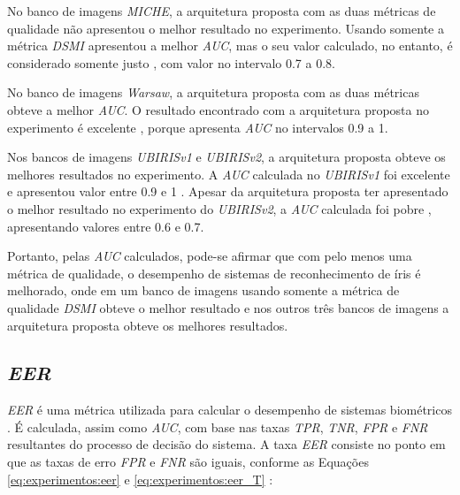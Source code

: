 \par No banco de imagens \textit{MICHE}, a arquitetura proposta com as duas métricas de qualidade não apresentou o melhor resultado no experimento. Usando somente a métrica \textit{\acrshort{DSMI}} apresentou a melhor \textit{\acrshort{AUC}}, mas o seu valor calculado, no entanto, é considerado somente justo \cite{aucROC}, com valor no intervalo 0.7 a 0.8.

\par No banco de imagens \textit{\acrshort{Warsaw}}, a arquitetura proposta com as duas métricas obteve a melhor \textit{\acrshort{AUC}}. O resultado encontrado com a arquitetura proposta no experimento é excelente \cite{aucROC}, porque apresenta \textit{\acrshort{AUC}} no intervalos 0.9 a 1.

\par Nos bancos de imagens \textit{UBIRISv1} e \textit{UBIRISv2}, a arquitetura proposta obteve os melhores resultados no experimento. A \textit{\acrshort{AUC}} calculada no \textit{UBIRISv1} foi excelente e apresentou valor entre 0.9 e 1 \cite{aucROC}. Apesar da arquitetura proposta ter apresentado o melhor resultado no experimento do \textit{UBIRISv2}, a \textit{\acrshort{AUC}} calculada foi pobre \cite{aucROC}, apresentando valores entre 0.6 e 0.7.

\par Portanto, pelas \textit{\acrshort{AUC}} calculados, pode-se afirmar que com pelo menos uma métrica de qualidade, o desempenho de sistemas de reconhecimento de íris é melhorado, onde em um banco de imagens usando somente a métrica de qualidade \textit{\acrshort{DSMI}} obteve o melhor resultado e nos outros três bancos de imagens a arquitetura proposta obteve os melhores resultados. 

\FloatBarrier

\subsection{\textit{\acrfull{EER}}} \label{sec:experimentos:eer}

\par \textit{\acrshort{EER}} é uma métrica utilizada para calcular o desempenho de sistemas biométricos \cite{eer}. É calculada, assim como \textit{\acrshort{AUC}}, com base nas taxas \textit{\acrshort{TPR}}, \textit{\acrshort{TNR}}, \textit{\acrshort{FPR}} e \textit{\acrshort{FNR}} resultantes do processo de decisão do sistema. A taxa \textit{\acrshort{EER}} consiste no ponto em que as taxas de erro \textit{\acrshort{FPR}} e \textit{\acrshort{FNR}} são iguais, conforme as Equações \ref{eq:experimentos:eer} e \ref{eq:experimentos:eer_T} \cite{d33BEAT}:


